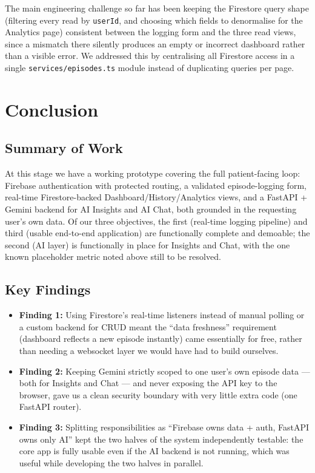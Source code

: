 \documentclass[11pt,a4paper]{article}
\begin{document}
The main engineering challenge so far has been keeping the Firestore query shape (filtering
every read by \texttt{userId}, and choosing which fields to denormalise for the Analytics
page) consistent between the logging form and the three read views, since a mismatch there
silently produces an empty or incorrect dashboard rather than a visible error. We addressed
this by centralising all Firestore access in a single \texttt{services/episodes.ts} module
instead of duplicating queries per page.

\section{Conclusion}

\subsection{Summary of Work}
At this stage we have a working prototype covering the full patient-facing loop: Firebase
authentication with protected routing, a validated episode-logging form, real-time
Firestore-backed Dashboard/History/Analytics views, and a FastAPI + Gemini backend for AI
Insights and AI Chat, both grounded in the requesting user's own data. Of our three objectives,
the first (real-time logging pipeline) and third (usable end-to-end application) are
functionally complete and demoable; the second (AI layer) is functionally in place for
Insights and Chat, with the one known placeholder metric noted above still to be resolved.

\subsection{Key Findings}
\begin{itemize}
    \item \textbf{Finding 1:} Using Firestore's real-time listeners instead of manual polling
    or a custom backend for CRUD meant the ``data freshness'' requirement (dashboard reflects a
    new episode instantly) came essentially for free, rather than needing a websocket layer we
    would have had to build ourselves.
    \item \textbf{Finding 2:} Keeping Gemini strictly scoped to one user's own episode data —
    both for Insights and Chat — and never exposing the API key to the browser, gave us a clean
    security boundary with very little extra code (one FastAPI router).
    \item \textbf{Finding 3:} Splitting responsibilities as ``Firebase owns data + auth,
    FastAPI owns only AI'' kept the two halves of the system independently testable: the core
    app is fully usable even if the AI backend is not running, which was useful while developing
    the two halves in parallel.
\end{itemize}
\end{document}
